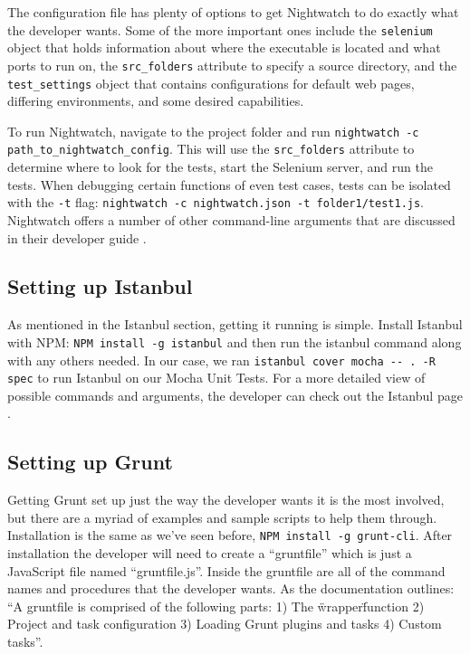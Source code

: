 \documentclass[12pt]{ucthesis}
\begin{document}
The configuration file has plenty of options to get Nightwatch to do exactly what the developer wants. Some of the more important ones include the \lstinline{selenium} object that holds information about where the executable is located and what ports to run on, the \lstinline{src_folders} attribute to specify a source directory, and the \lstinline{test_settings} object that contains configurations for default web pages, differing environments, and some desired capabilities. 

To run Nightwatch, navigate to the project folder and run \lstinline{nightwatch -c path_to_nightwatch_config}. This will use the \lstinline{src_folders} attribute to determine where to look for the tests, start the Selenium server, and run the tests. When debugging certain functions of even test cases, tests can be isolated with the \lstinline{-t} flag: \lstinline{nightwatch -c nightwatch.json -t folder1/test1.js}. Nightwatch offers a number of other command-line arguments that are discussed in their developer guide \cite{NightwatchJS}.

\subsection{Setting up Istanbul}
As mentioned in the Istanbul section, getting it running is simple. Install Istanbul with NPM: \lstinline{NPM install -g istanbul} and then run the istanbul command along with any others needed. In our case, we ran \lstinline{istanbul cover mocha -- . -R spec} to run Istanbul on our Mocha Unit Tests. For a more detailed view of possible commands and arguments, the developer can check out the Istanbul page \cite{Istanbul}.

\subsection{Setting up Grunt}
Getting Grunt set up just the way the developer wants it is the most involved, but there are a myriad of examples and sample scripts to help them through. Installation is the same as we've seen before, \lstinline{NPM install -g grunt-cli}. After installation the developer will need to create a ``gruntfile'' which is just a JavaScript file named ``gruntfile.js''. Inside the gruntfile are all of the command names and procedures that the developer wants. As the documentation outlines: ``A gruntfile is comprised of the following parts: 1) The \"wrapper\" function 2) Project and task configuration 3) Loading Grunt plugins and tasks 4) Custom tasks''\cite{GruntJS}.
\end{document}
